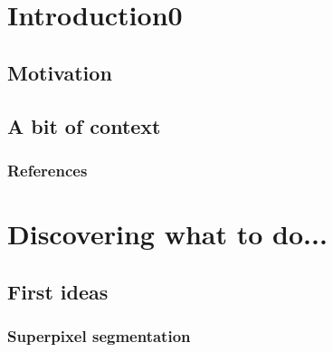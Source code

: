 \documentclass[11pt,fleqn]{book} %
\begin{document}

\pagestyle{empty} %

\tableofcontents %


\pagestyle{fancy} %



\chapter{Introduction0}

\section{Motivation}

\section{A bit of context}

\subsection{References}


\chapter{Discovering what to do...}

\section{First ideas}

\subsection{Superpixel segmentation}
\end{document}
